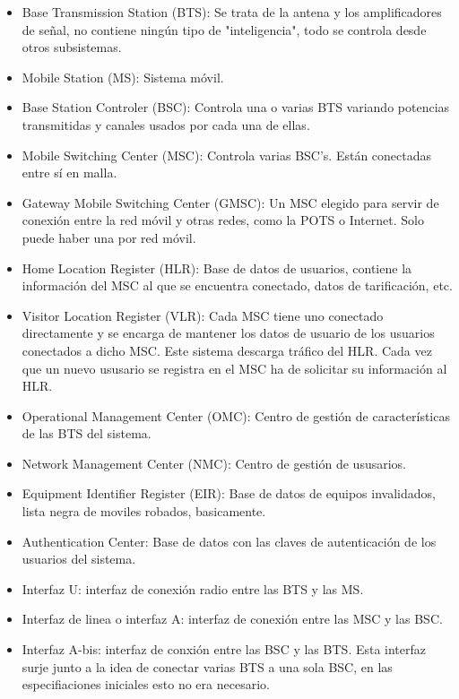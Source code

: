 \begin{itemize}
	\item Base Transmission Station (\acrshort{BTS}): Se trata de la antena y los amplificadores de señal, no contiene ningún tipo de "inteligencia", todo se controla desde otros subsistemas.
	\item Mobile Station (\acrshort{MS}): Sistema móvil.
	\item Base Station Controler (\acrshort{BSC}): Controla una o varias \acrshort{BTS} variando potencias transmitidas y canales usados por cada una de ellas.
	\item Mobile Switching Center (\acrshort{MSC}): Controla varias \acrshort{BSC}'s. Están conectadas entre sí en malla.
	\item Gateway Mobile Switching Center (\acrshort{GMSC}): Un \acrshort{MSC} elegido para servir de conexión entre la red móvil y otras redes, como la POTS o Internet. Solo puede haber una por red móvil.
	\item Home Location Register (\acrshort{HLR}): Base de datos de usuarios, contiene la información del \acrshort{MSC} al que se encuentra conectado, datos de tarificación, etc.
	\item Visitor Location Register (\acrshort{VLR}): Cada \acrshort{MSC} tiene uno conectado directamente y se encarga de mantener los datos de usuario de los usuarios conectados a dicho \acrshort{MSC}. Este sistema descarga tráfico del \acrshort{HLR}. Cada vez que un nuevo ususario se registra en el \acrshort{MSC} ha de solicitar su información al \acrshort{HLR}.
	\item Operational Management Center (\acrshort{OMC}): Centro de gestión de características de las \acrshort{BTS}  del sistema.
	\item Network Management Center (\acrshort{NMC}): Centro de gestión de ususarios.
	\item Equipment Identifier Register (\acrshort{EIR}): Base de datos de equipos invalidados, lista negra de moviles robados, basicamente.
	\item Authentication Center: Base de datos con las claves de autenticación de los usuarios del sistema.
	\item Interfaz U: interfaz de conexión radio entre las \acrshort{BTS} y las \acrshort{MS}.
	\item Interfaz de linea o interfaz A: interfaz de conexión entre las \acrshort{MSC} y las \acrshort{BSC}.
	\item Interfaz A-bis: interfaz de conxión entre las \acrshort{BSC} y las \acrshort{BTS}. Esta interfaz surje junto a la idea de conectar varias \acrshort{BTS} a una sola \acrshort{BSC}, en las especifiaciones iniciales esto no era necesario.
\end{itemize}
